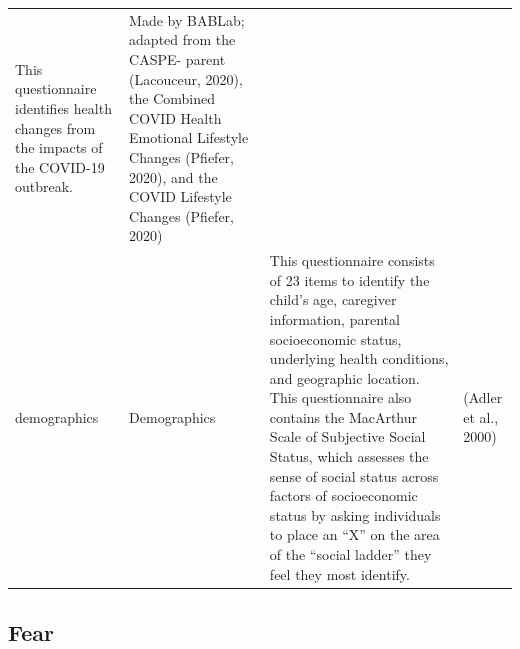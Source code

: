 \documentclass[]{book}
\begin{document}
\begin{longtable}[]{@{}llll@{}}
\begin{minipage}[t]{0.30\columnwidth}
This questionnaire identifies health changes from the impacts of the COVID-19 outbreak.\strut
\end{minipage} & \begin{minipage}[t]{0.24\columnwidth}\raggedright
Made by BABLab; adapted from the CASPE- parent (Lacouceur, 2020), the Combined COVID Health Emotional Lifestyle Changes (Pfiefer, 2020), and the COVID Lifestyle Changes (Pfiefer, 2020)\strut
\end{minipage}\tabularnewline
\begin{minipage}[t]{0.14\columnwidth}\raggedright
demographics\strut
\end{minipage} & \begin{minipage}[t]{0.22\columnwidth}\raggedright
Demographics\strut
\end{minipage} & \begin{minipage}[t]{0.30\columnwidth}\raggedright
This questionnaire consists of 23 items to identify the child's age, caregiver information, parental socioeconomic status, underlying health conditions, and geographic location. This questionnaire also contains the MacArthur Scale of Subjective Social Status, which assesses the sense of social status across factors of socioeconomic status by asking individuals to place an ``X'' on the area of the ``social ladder'' they feel they most identify.\strut
\end{minipage} & \begin{minipage}[t]{0.24\columnwidth}\raggedright
(Adler et al., 2000)\strut
\end{minipage}\tabularnewline
\bottomrule
\end{longtable}

\hypertarget{fear-1}{%
\subsection{Fear}\label{fear-1}}
\end{document}
